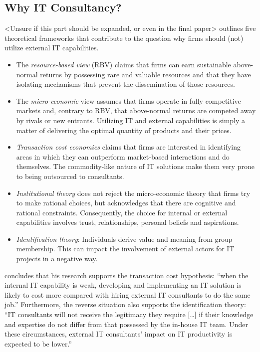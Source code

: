 \documentclass[12pt]{article}
\providecommand{\tightlist}{%
  \setlength{\itemsep}{0pt}\setlength{\parskip}{0pt}}
\begin{document}
\hypertarget{why-it-consultancy}{%
\subsection{Why IT Consultancy?}\label{why-it-consultancy}}

\textless Unsure if this part should be expanded, or even in the final
paper\textgreater{} \citet[8-10]{nevo2007} outlines five theoretical
frameworks that contribute to the question why firms should (not)
utilize external IT capabilities.

\begin{itemize}
\tightlist
\item
  The \emph{resource-based view} (RBV) claims that firms can earn
  sustainable above-normal returns by possessing rare and valuable
  resources and that they have isolating mechanisms that prevent the
  dissemination of those resources.
\item
  The \emph{micro-economic} view assumes that firms operate in fully
  competitive markets and, contrary to RBV, that above-normal returns
  are competed away by rivals or new entrants. Utilizing IT and external
  capabilities is simply a matter of delivering the optimal quantity of
  products and their prices.
\item
  \emph{Transaction cost economics} claims that firms are interested in
  identifying areas in which they can outperform market-based
  interactions and do themselves. The commodity-like nature of IT
  solutions make them very prone to being outsourced to consultants.
\item
  \emph{Institutional theory} does not reject the micro-economic theory
  that firms try to make rational choices, but acknowledges that there
  are cognitive and rational constraints. Consequently, the choice for
  internal or external capabilities involves trust, relationships,
  personal beliefs and aspirations.
\item
  \emph{Identification theory}: Individuals derive value and meaning
  from group membership. This can impact the involvement of external
  actors for IT projects in a negative way.
\end{itemize}

\citet[16-17]{nevo2007} concludes that his research supports the
transaction cost hypothesis: ``when the internal IT capability is weak,
developing and implementing an IT solution is likely to cost more
compared with hiring external IT consultants to do the same job.''
Furthermore, the reverse situation also supports the identification
theory: ``IT consultants will not receive the legitimacy they require
{[}\ldots{]} if their knowledge and expertise do not differ from that
possessed by the in-house IT team. Under these circumstances, external
IT consultants' impact on IT productivity is expected to be lower.''
\end{document}
